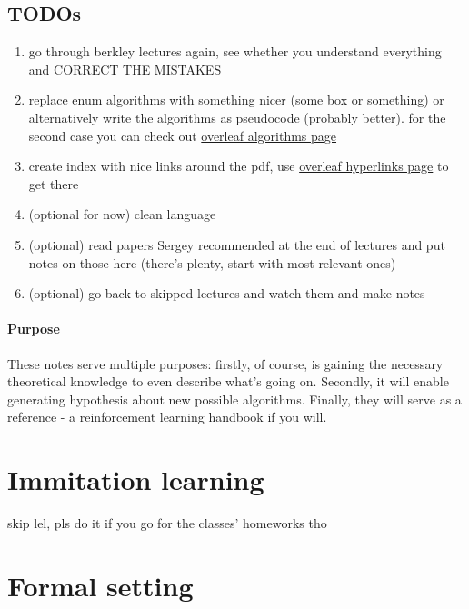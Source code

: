 \documentclass{report}
\begin{document}
\section{TODOs}
\begin{enumerate}
		\item go through berkley lectures again, see whether you understand everything and CORRECT THE MISTAKES
		\item replace enum algorithms with something nicer (some box or something) or alternatively write the algorithms as pseudocode (probably better).
				for the second case you can check out \href{https://www.overleaf.com/learn/latex/Algorithms}{overleaf algorithms page}
		\item create index with nice links around the pdf, use \href{https://www.overleaf.com/learn/latex/Hyperlinks}{overleaf hyperlinks page} to get there
		\item (optional for now) clean language
		\item (optional) read papers Sergey recommended at the end of lectures and put notes on those here (there's plenty, start with most relevant ones)
		\item (optional) go back to skipped lectures and watch them and make notes
\end{enumerate}

\subsubsection{Purpose}
These notes serve multiple purposes:
firstly, of course, is gaining the necessary theoretical knowledge to even describe what's going on.
Secondly, it will enable generating hypothesis about new possible algorithms.
Finally, they will serve as a reference - a reinforcement learning handbook if you will.


\chapter{Immitation learning}
skip lel, pls do it if you go for the classes' homeworks tho

\chapter{Formal setting}
\end{document}
